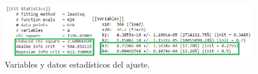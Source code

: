\begin{itemize}
        \begin{figure}[H]
            \centering
            \includegraphics[scale=0.53]{img/ajustemodSolstats.png}
            \caption{Variables y datos estadísticos del ajuste.}
            \label{ajustemodSolstatspng}
        \end{figure}
        
        
    
    
\end{itemize}






% 

